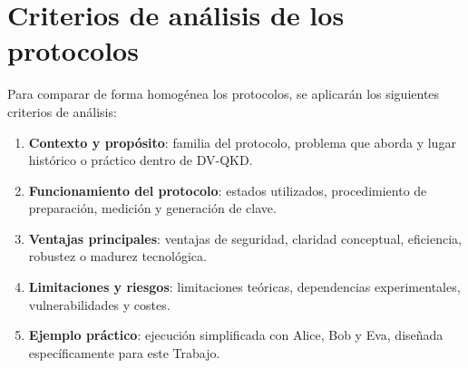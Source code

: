 \section{Criterios de análisis de los protocolos}

Para comparar de forma homogénea los protocolos, se aplicarán los siguientes criterios de análisis:

\begin{enumerate}
    \item \textbf{Contexto y propósito}: familia del protocolo, problema que aborda y lugar histórico o práctico dentro de DV-QKD.
    \item \textbf{Funcionamiento del protocolo}: estados utilizados, procedimiento de preparación, medición y generación de clave.
    \item \textbf{Ventajas principales}: ventajas de seguridad, claridad conceptual, eficiencia, robustez o madurez tecnológica.
    \item \textbf{Limitaciones y riesgos}: limitaciones teóricas, dependencias experimentales, vulnerabilidades y costes.
    \item \textbf{Ejemplo práctico}: ejecución simplificada con Alice, Bob y Eva, diseñada específicamente para este Trabajo.
\end{enumerate}
